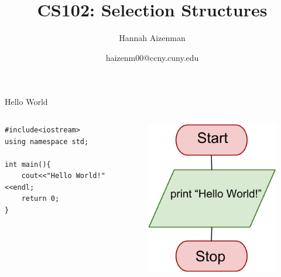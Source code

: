 \documentclass[xcolor={dvipsnames}]{beamer}
\begin{document}
\title{ CS102: Selection Structures}
\author{Hannah Aizenman}
\date{haizenm00@ccny.cuny.edu}


\begin{frame}
	\titlepage
\end{frame}

\begin{frame}[fragile]{Hello World}
\begin{columns}
\begin{column}{0.5\textwidth}
\begin{verbatim}
#include<iostream>
using namespace std;

int main(){
    cout<<"Hello World!"<<endl;
    return 0;
}
\end{verbatim}
  \end{column}
  \begin{column}{0.5\textwidth}
	\pause
	\begin{figure}
		\includegraphics[width=1\textwidth]{hello}
	\end{figure}
  \end{column}
\end{columns}
\end{frame}
\end{document}
